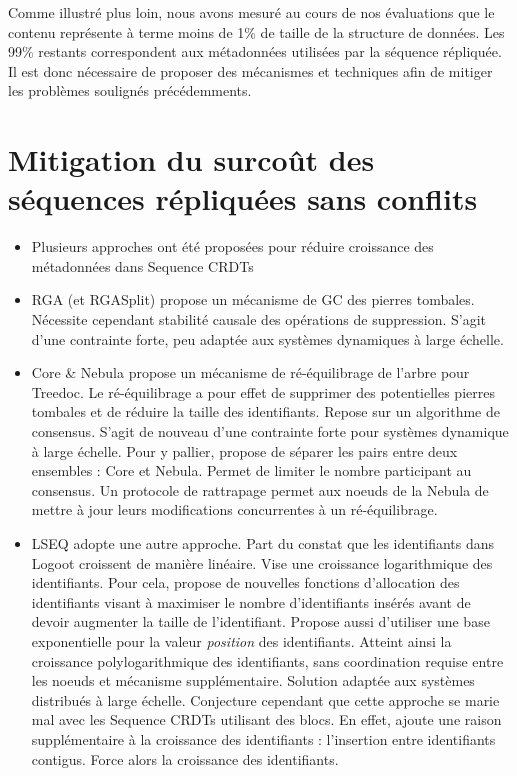 \documentclass[12pt]{thesul}
\begin{document}
Comme illustré plus loin, nous avons mesuré au cours de nos évaluations que le contenu représente à terme moins de 1\% de taille de la structure de données.
Les 99\% restants correspondent aux métadonnées utilisées par la séquence répliquée.
Il est donc nécessaire de proposer des mécanismes et techniques afin de mitiger les problèmes soulignés précédemments.

\section{Mitigation du surcoût des séquences répliquées sans conflits}

\begin{itemize}
  \item Plusieurs approches ont été proposées pour réduire croissance des métadonnées dans Sequence \acp{CRDT}
  \item RGA (et RGASplit) propose un mécanisme de GC des pierres tombales.
    Nécessite cependant stabilité causale des opérations de suppression.
    S'agit d'une contrainte forte, peu adaptée aux systèmes dynamiques à large échelle.
  \item Core \& Nebula propose un mécanisme de ré-équilibrage de l'arbre pour Treedoc.
    Le ré-équilibrage a pour effet de supprimer des potentielles pierres tombales et de réduire la taille des identifiants.
    Repose sur un algorithme de consensus.
    S'agit de nouveau d'une contrainte forte pour systèmes dynamique à large échelle.
    Pour y pallier, propose de séparer les pairs entre deux ensembles : Core et Nebula.
    Permet de limiter le nombre participant au consensus.
    Un protocole de rattrapage permet aux noeuds de la Nebula de mettre à jour leurs modifications concurrentes à un ré-équilibrage.
  \item LSEQ adopte une autre approche.
    Part du constat que les identifiants dans Logoot croissent de manière linéaire.
    Vise une croissance logarithmique des identifiants.
    Pour cela, propose de nouvelles fonctions d'allocation des identifiants visant à maximiser le nombre d'identifiants insérés avant de devoir augmenter la taille de l'identifiant.
    Propose aussi d'utiliser une base exponentielle pour la valeur \emph{position} des identifiants.
    Atteint ainsi la croissance polylogarithmique des identifiants, sans coordination requise entre les noeuds et mécanisme supplémentaire.
    Solution adaptée aux systèmes distribués à large échelle.
    Conjecture cependant que cette approche se marie mal avec les Sequence \acp{CRDT} utilisant des blocs.
    En effet, ajoute une raison supplémentaire à la croissance des identifiants : l'insertion entre identifiants contigus.
    Force alors la croissance des identifiants.
\end{itemize}
\end{document}
